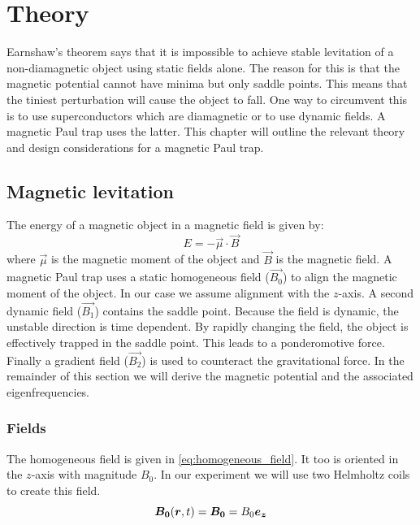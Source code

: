\chapter{Theory}
\label{chap:theory}
Earnshaw's theorem says that it is impossible to achieve stable levitation of a non-diamagnetic object using static fields alone. The reason for this is that the magnetic potential cannot have minima but only saddle points. This means that the tiniest perturbation will cause the object to fall. One way to circumvent this is to use superconductors which are diamagnetic or to use dynamic fields. A magnetic Paul trap uses the latter. This chapter will outline the relevant theory and design considerations for a magnetic Paul trap.

\section{Magnetic levitation}
\label{sec:magnetic_levitation}
The energy of a magnetic object in a magnetic field is given by:
\begin{equation}
    E = -\vec{\mu} \cdot \vec{B}
    \tag{magnetic potential}
    \label{eq:magnetic_potential_definition}
\end{equation}
where $\vec{\mu}$ is the magnetic moment of the object and $\vec{B}$ is the magnetic field. A magnetic Paul trap uses a static homogeneous field ($\vec{B_0}$) to align the magnetic moment of the object. In our case we assume alignment with the $z$-axis. A second dynamic field ($\vec{B_1}$) contains the saddle point. Because the field is dynamic, the unstable direction is time dependent. By rapidly changing the field, the object is effectively trapped in the saddle point. This leads to a ponderomotive force\cite{perdriat}. Finally a gradient field ($\vec{B_2}$) is used to counteract the gravitational force\cite{perdriat}. In the remainder of this section we will derive the magnetic potential and the associated eigenfrequencies.

\subsection{Fields}
\label{subsec:fields}
The homogeneous field is given in \autoref{eq:homogeneous_field}. It too is oriented in the $z$-axis with magnitude $B_0$. In our experiment we will use two Helmholtz coils to create this field.
\begin{equation}
    \bm{B_0}(\bm{r}, t) = \bm{B_0} = B_0 \bm{e_z}
    \label{eq:homogeneous_field}
\end{equation}


